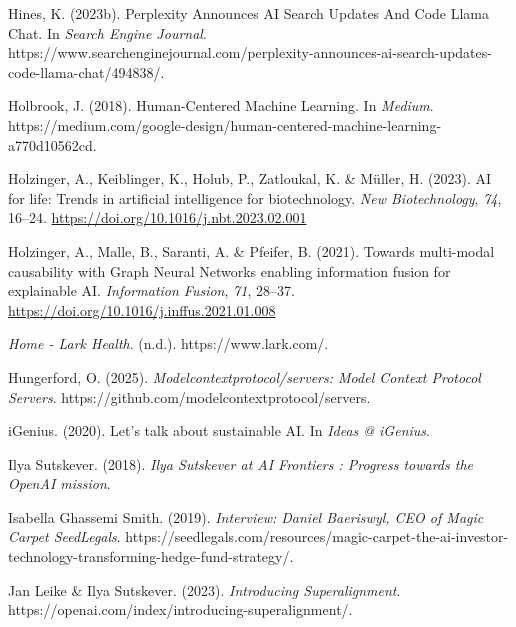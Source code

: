 \documentclass[
  letterpaper,
  DIV=11,
  numbers=noendperiod]{scrartcl}
\newlength{\cslhangindent}
\newenvironment{CSLReferences}[2] %
 {\begin{list}{}{%
  \setlength{\itemindent}{0pt}
  \setlength{\leftmargin}{0pt}
  \setlength{\parsep}{0pt}
  \ifodd #1
   \setlength{\leftmargin}{\cslhangindent}
   \setlength{\itemindent}{-1\cslhangindent}
  \fi
  \setlength{\itemsep}{#2\baselineskip}}}
 {\end{list}}
\begin{document}
\begin{CSLReferences}{1}{0}
Hines, K. (2023b). Perplexity {Announces AI Search Updates And Code
Llama Chat}. In \emph{Search Engine Journal}.
https://www.searchenginejournal.com/perplexity-announces-ai-search-updates-code-llama-chat/494838/.

Holbrook, J. (2018). Human-{Centered Machine Learning}. In
\emph{Medium}.
https://medium.com/google-design/human-centered-machine-learning-a770d10562cd.

Holzinger, A., Keiblinger, K., Holub, P., Zatloukal, K. \& Müller, H.
(2023). {AI} for life: {Trends} in artificial intelligence for
biotechnology. \emph{New Biotechnology}, \emph{74}, 16--24.
\url{https://doi.org/10.1016/j.nbt.2023.02.001}

Holzinger, A., Malle, B., Saranti, A. \& Pfeifer, B. (2021). Towards
multi-modal causability with {Graph Neural Networks} enabling
information fusion for explainable {AI}. \emph{Information Fusion},
\emph{71}, 28--37. \url{https://doi.org/10.1016/j.inffus.2021.01.008}

\emph{Home - {Lark Health}}. (n.d.). https://www.lark.com/.

Hungerford, O. (2025). \emph{Modelcontextprotocol/servers: {Model
Context Protocol Servers}}.
https://github.com/modelcontextprotocol/servers.

iGenius. (2020). Let's talk about sustainable {AI}. In \emph{Ideas @
iGenius}.

Ilya Sutskever. (2018). \emph{Ilya {Sutskever} at {AI Frontiers} :
{Progress} towards the {OpenAI} mission}.

Isabella Ghassemi Smith. (2019). \emph{Interview: {Daniel Baeriswyl},
{CEO} of {Magic Carpet} {\textbar} {SeedLegals}}.
https://seedlegals.com/resources/magic-carpet-the-ai-investor-technology-transforming-hedge-fund-strategy/.

Jan Leike \& Ilya Sutskever. (2023). \emph{Introducing
{Superalignment}}. https://openai.com/index/introducing-superalignment/.


\end{CSLReferences}
\end{document}
